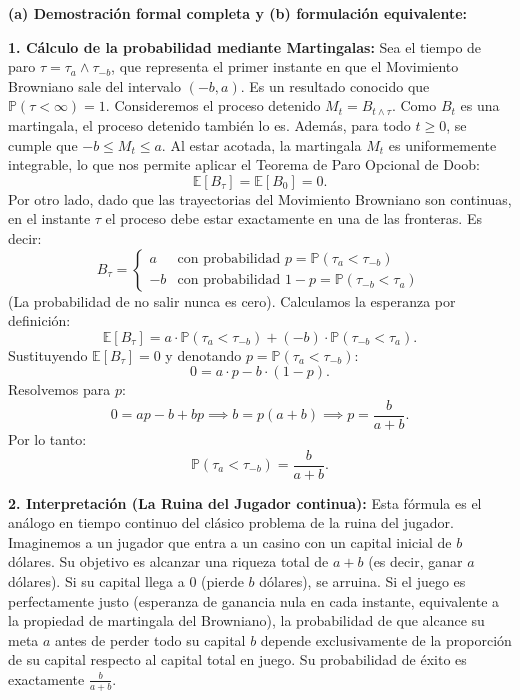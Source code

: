 \documentclass[11pt, letterpaper]{article}
\begin{document}
\begin{solucion}
    \vspace{3mm}
    \textbf{(a) Demostración formal completa y (b) formulación equivalente:}

    \textbf{1. Cálculo de la probabilidad mediante Martingalas:}
    Sea el tiempo de paro $\tau = \tau_a \wedge \tau_{-b}$, que representa el primer instante en que el Movimiento Browniano sale del intervalo $(-b, a)$. Es un resultado conocido que $\mathbb{P}(\tau < \infty) = 1$.
    Consideremos el proceso detenido $M_t = B_{t \wedge \tau}$. Como $B_t$ es una martingala, el proceso detenido también lo es. Además, para todo $t \ge 0$, se cumple que $-b \le M_t \le a$. 
    Al estar acotada, la martingala $M_t$ es uniformemente integrable, lo que nos permite aplicar el Teorema de Paro Opcional de Doob:
    \[ \mathbb{E}[B_\tau] = \mathbb{E}[B_0] = 0. \]
    Por otro lado, dado que las trayectorias del Movimiento Browniano son continuas, en el instante $\tau$ el proceso debe estar exactamente en una de las fronteras. Es decir:
    \[ B_\tau = \begin{cases} 
      a & \text{con probabilidad } p = \mathbb{P}(\tau_a < \tau_{-b}) \\
      -b & \text{con probabilidad } 1 - p = \mathbb{P}(\tau_{-b} < \tau_a)
   \end{cases} \]
    (La probabilidad de no salir nunca es cero).
    Calculamos la esperanza por definición:
    \[ \mathbb{E}[B_\tau] = a \cdot \mathbb{P}(\tau_a < \tau_{-b}) + (-b) \cdot \mathbb{P}(\tau_{-b} < \tau_a). \]
    Sustituyendo $\mathbb{E}[B_\tau] = 0$ y denotando $p = \mathbb{P}(\tau_a < \tau_{-b})$:
    \[ 0 = a \cdot p - b \cdot (1 - p). \]
    Resolvemos para $p$:
    \[ 0 = ap - b + bp \implies b = p(a + b) \implies p = \frac{b}{a + b}. \]
    Por lo tanto:
    \[ \mathbb{P}(\tau_a < \tau_{-b}) = \frac{b}{a + b}. \]

    \textbf{2. Interpretación (La Ruina del Jugador continua):}
    Esta fórmula es el análogo en tiempo continuo del clásico problema de la ruina del jugador. Imaginemos a un jugador que entra a un casino con un capital inicial de $b$ dólares. Su objetivo es alcanzar una riqueza total de $a + b$ (es decir, ganar $a$ dólares). Si su capital llega a $0$ (pierde $b$ dólares), se arruina. 
    Si el juego es perfectamente justo (esperanza de ganancia nula en cada instante, equivalente a la propiedad de martingala del Browniano), la probabilidad de que alcance su meta $a$ antes de perder todo su capital $b$ depende exclusivamente de la proporción de su capital respecto al capital total en juego. Su probabilidad de éxito es exactamente $\frac{b}{a+b}$.


\end{solucion}
\end{document}

